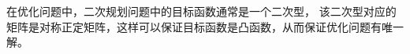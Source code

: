 
\begin{note}
    在优化问题中，二次规划问题中的目标函数通常是一个二次型，
    该二次型对应的矩阵是对称正定矩阵，这样可以保证目标函数是凸函数，从而保证优化问题有唯一解。
\end{note}

\newpage